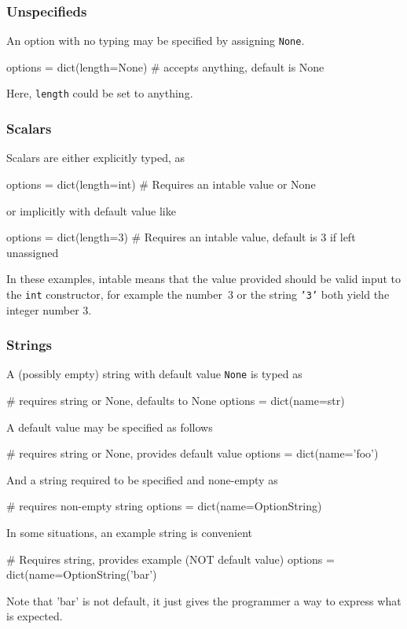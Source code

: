 \subsubsection{Unspecifieds}
An option with no typing may be specified by assigning \texttt{None}.
\begin{python}
  options = dict(length=None)
  # accepts anything, default is None
\end{python}
Here, \texttt{length} could be set to anything.



\subsubsection*{Scalars}
Scalars are either explicitly typed, as
\begin{python}
  options = dict(length=int)
  # Requires an intable value or None
\end{python}
or implicitly with default value like

\begin{python}
  options = dict(length=3)
  # Requires an intable value, default is 3 if left unassigned
\end{python}
In these examples, intable means that the value provided should be
valid input to the \texttt{int} constructor, for example the number~3
or the string \texttt{'3'} both yield the integer number 3.



\subsubsection*{Strings}
A (possibly empty) string with default value \texttt{None} is typed as
\begin{python}
  # requires string or None, defaults to None
  options = dict(name=str)
\end{python}
A default value may be specified as follows
\begin{python}
  # requires string or None, provides default value
  options = dict(name='foo')
\end{python}
And a string required to be specified and none-empty as
\begin{python}
  # requires non-empty string
  options = dict(name=OptionString)
\end{python}
In some situations, an example string is convenient
\begin{python}
  # Requires string, provides example (NOT default value)
  options = dict(name=OptionString('bar')
\end{python}
Note that 'bar' is not default, it just gives the programmer a way to
express what is expected.



